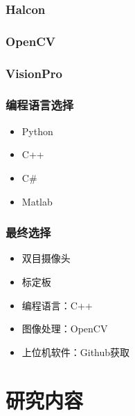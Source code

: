 \documentclass[aspectratio=43]{beamer}
\begin{document}
\begin{frame}
	\frametitle{Halcon}	
\end{frame}	

\begin{frame}
	\frametitle{OpenCV}	
\end{frame}

\begin{frame}
	\frametitle{VisionPro}	
\end{frame}		


\begin{frame}
	\frametitle{编程语言选择}
	\begin{itemize}
		\item Python
		\item C++
		\item C\#
		\item Matlab
	\end{itemize}
\end{frame}




\begin{frame}
	\frametitle{最终选择}
	\begin{itemize}
		\item 双目摄像头
		\item 标定板
		\item 编程语言：C++
		\item 图像处理：OpenCV
		\item 上位机软件：Github获取
	\end{itemize}
\end{frame}			


\section{研究内容}



\end{document}
